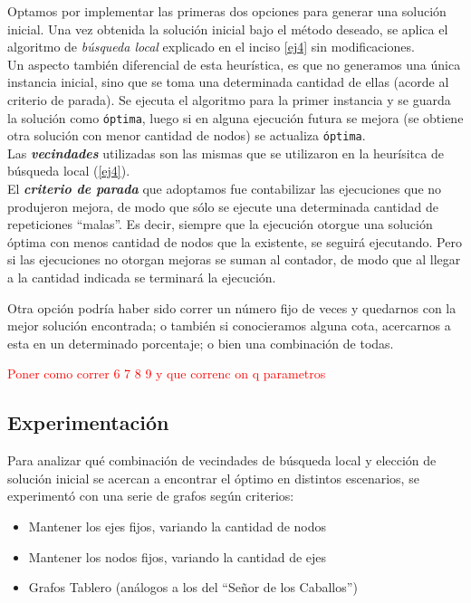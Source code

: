 Optamos por implementar las primeras dos opciones para generar una solución inicial. Una vez obtenida la solución inicial bajo el método deseado, se aplica el algoritmo de \emph{b\'usqueda local} explicado en el inciso \ref{ej4} sin modificaciones.\\

Un aspecto tambi\'en diferencial de esta heur\'istica, es que no generamos una \'unica instancia inicial, sino que se toma una determinada cantidad de ellas (acorde al criterio de parada). Se ejecuta el algoritmo para la primer instancia y se guarda la solución como \texttt{\'optima}, luego si en alguna ejecución futura se mejora (se obtiene otra solución con menor cantidad de nodos) se actualiza \texttt{\'optima}.\\

Las \emph{\textbf{vecindades}} utilizadas son las mismas que se utilizaron en la heur\'isitca de b\'usqueda local (\ref{ej4}).\\

El \emph{\textbf{criterio de parada}} que adoptamos fue contabilizar las ejecuciones que no produjeron mejora, de modo que sólo se ejecute una determinada cantidad de repeticiones ``malas''. Es decir, siempre que la ejecución otorgue una solución óptima con menos cantidad de nodos que la existente, se seguirá ejecutando. Pero si las ejecuciones no otorgan mejoras se suman al contador, de modo que al llegar a la cantidad indicada se terminará la ejecución.

Otra opci\'on podr\'ia haber sido correr un n\'umero fijo de veces y quedarnos con la mejor soluci\'on encontrada; o tambi\'en si conocieramos alguna cota, acercarnos a esta en un determinado porcentaje; o bien una combinaci\'on de todas.

\textcolor{red}{Poner como correr 6 7 8 9 y que correnc on q parametros}

\newpage
\subsection{Experimentaci\'on}

Para analizar qu\'e combinaci\'on de vecindades de b\'usqueda local y elecci\'on de soluci\'on inicial se acercan a encontrar el \'optimo en distintos escenarios, se experiment\'o con una serie de grafos seg\'un criterios:
\begin{itemize}
	\item Mantener los ejes fijos, variando la cantidad de nodos
	\item Mantener los nodos fijos, variando la cantidad de ejes
	\item Grafos Tablero (an\'alogos a los del ``Se\~nor de los Caballos'')
\end{itemize}

